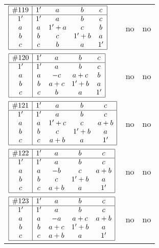 \documentclass[12pt]{article}
\theoremstyle{definition}
\newcommand{\join}{\mathbin{+}}%
\newcommand{\id}{{1'}}%
\begin{document}
\begin{center}
\begin{longtable}{l|c|c}
$
\begin{array}{|c|cccc|} \hline
\#119 & \id & a & b & c \\ \hline
\id & \id & a & b & c \\
a & a & \id \join a & c & b \\
b & b & c & \id \join b & a \\
c & c & b & a & \id \\ \hline
\end{array}
$
 & no  
 & no      \\[15mm]

$
\begin{array}{|c|cccc|} \hline
\#120 & \id & a & b & c \\ \hline
\id & \id & a & b & c \\
a & a & -c & a \join c & b \\
b & b & a \join c & \id \join b & a \\
c & c & b & a & \id \\ \hline
\end{array}
$
 & no  
 & no      \\[15mm]

$
\begin{array}{|c|cccc|} \hline
\#121 & \id & a & b & c \\ \hline
\id & \id & a & b & c \\
a & a & \id \join c & c & a \join b \\
b & b & c & \id \join b & a \\
c & c & a \join b & a & \id \\ \hline
\end{array}
$
 & no  
 & no      \\[15mm]

$
\begin{array}{|c|cccc|} \hline
\#122 & \id & a & b & c \\ \hline
\id & \id & a & b & c \\
a & a & -b & c & a \join b \\
b & b & c & \id \join b & a \\
c & c & a \join b & a & \id \\ \hline
\end{array}
$
 & no  
 & no      \\[15mm]

$
\begin{array}{|c|cccc|} \hline
\#123 & \id & a & b & c \\ \hline
\id & \id & a & b & c \\
a & a & -a & a \join c & a \join b \\
b & b & a \join c & \id \join b & a \\
c & c & a \join b & a & \id \\ \hline
\end{array}
$
 & no  
 & no       \\[15mm]


\end{longtable}
\end{center}
\end{document}
